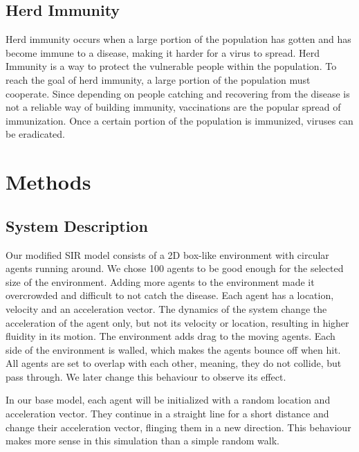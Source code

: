\documentclass[a4paper,11pt]{article}
\begin{document}
    \subsection{Herd Immunity}\label{subsec:herd-immunity2}
    Herd immunity\cite{herdImm} occurs when a large portion of the population has gotten and has become immune to a disease, making it harder for a virus to spread.
    Herd Immunity is a way to protect the vulnerable people within the population.
    To reach the goal of herd immunity, a large portion of the population must cooperate.
    Since depending on people catching and recovering from the disease is not a reliable way of building immunity, vaccinations are the popular spread of immunization.
    Once a certain portion of the population is immunized, viruses can be eradicated.

    \section{Methods}\label{sec:methods}
    \subsection{System Description}\label{subsec:system-description}
    Our modified SIR model consists of a 2D box-like environment with circular agents running around.
    We chose 100 agents to be good enough for the selected size of the environment.
    Adding more agents to the environment made it overcrowded and difficult to not catch the disease.
    Each agent has a location, velocity and an acceleration vector\cite{natureOfCode}.
    The dynamics of the system change the acceleration of the agent only, but not its velocity or location, resulting in higher fluidity in its motion.
    The environment adds drag to the moving agents.
    Each side of the environment is walled, which makes the agents bounce off when hit.
    All agents are set to overlap with each other, meaning, they do not collide, but pass through.
    We later change this behaviour to observe its effect.

    In our base model, each agent will be initialized with a random location and acceleration vector.
    They continue in a straight line for a short distance and change their acceleration vector, flinging them in a new direction.
    This behaviour makes more sense in this simulation than a simple random walk.
\end{document}
